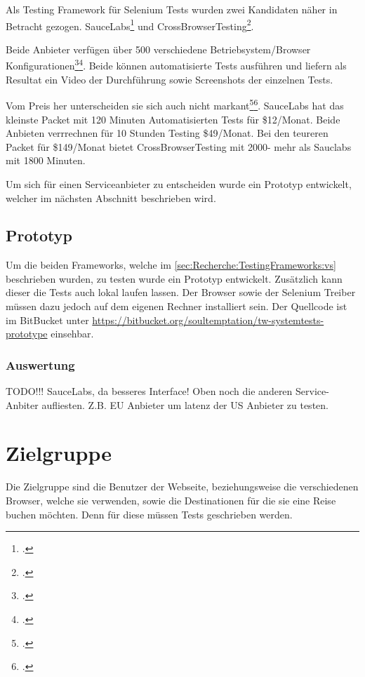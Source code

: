 Als Testing Framework für Selenium Tests wurden zwei Kandidaten näher in Betracht gezogen. SauceLabs\footcite{Sauce_Labs_2015-07-26} und CrossBrowserTesting\footcite{Cross_Browser_Testing_2015-07-26}.

Beide Anbieter verfügen über 500 verschiedene Betriebsystem/Browser Konfigurationen\footcite{Platforms_2015-07-26}\footcite{OS_Browser_Configurations_for_Cross_Browser_Compatibility_Testing_2015-07-26}. Beide können automatisierte Tests ausführen und liefern als Resultat ein Video der Durchführung sowie Screenshots der einzelnen Tests.

Vom Preis her unterscheiden sie sich auch nicht markant\footcite{Sauce_Labs_Pricing_2015-07-26}\footcite{Test_your_site_on_all_browsers_2015-07-26}. SauceLabs hat das kleinste Packet mit 120 Minuten Automatisierten Tests für \$12/Monat. Beide Anbieten verrrechnen für 10 Stunden Testing \$49/Monat. Bei den teureren Packet für \$149/Monat bietet CrossBrowserTesting mit 2000- mehr als Sauclabs mit 1800 Minuten.

Um sich für einen Serviceanbieter zu entscheiden wurde ein Prototyp entwickelt, welcher im nächsten Abschnitt beschrieben wird.

\subsection{Prototyp}
\label{sec:Recherche:TestingFrameworks:Prototyp}
Um die beiden Frameworks, welche im \cref{sec:Recherche:TestingFrameworks:vs}  beschrieben wurden, zu testen wurde ein Prototyp entwickelt. Zusätzlich kann dieser die Tests auch lokal laufen lassen. Der Browser sowie der Selenium Treiber müssen dazu jedoch auf dem eigenen Rechner installiert sein. Der Quellcode ist im BitBucket unter \url{https://bitbucket.org/soultemptation/tw-systemtests-prototype} einsehbar.

\subsubsection{Auswertung}
TODO!!!
SauceLabs, da besseres Interface!
Oben noch die anderen Service-Anbiter aufliesten. Z.B. EU Anbieter um latenz der US Anbieter zu testen.

\section{Zielgruppe}
\label{sec:Recherche:Zielgruppe}
Die Zielgruppe sind die Benutzer der Webseite, beziehungsweise die verschiedenen Browser, welche sie verwenden, sowie die Destinationen für die sie eine Reise buchen möchten. Denn für diese müssen Tests geschrieben werden.

